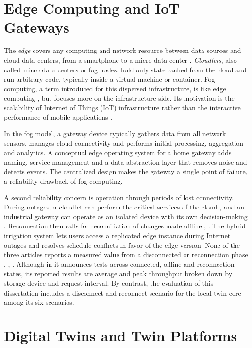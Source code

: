 \section{Edge Computing and IoT Gateways}\label{edge-computing-and-iot-gateways}

\noindent The \emph{edge} covers any computing and network resource between data sources and cloud data centers, from a smartphone to a micro data center \cite{word02} . \emph{Cloudlets}, also called micro data centers or fog nodes, hold only state cached from the cloud and run arbitrary code, typically inside a virtual machine or container\cite{word01}. Fog computing, a term introduced for this dispersed infrastructure\cite{word01}, is like edge computing \cite{word02} , but focuses more on the infrastructure side. Its motivation is the scalability of Internet of Things (IoT) infrastructure rather than the interactive performance of mobile applications \cite{word01}.

In the fog model, a gateway device typically gathers data from all network sensors, manages cloud connectivity and performs initial processing, aggregation and analytics\cite{word08}. A conceptual edge operating system for a home gateway adds naming, service management and a data abstraction layer that removes noise and detects events\cite{word02}. The centralized design makes the gateway a single point of failure, a reliability drawback of fog computing\cite{word08}.

A second reliability concern is operation through periods of lost connectivity. During outages, a cloudlet can perform the critical services of the cloud \cite{word01}, and an industrial gateway can operate as an isolated device with its own decision-making \cite{word08}. Reconnection then calls for reconciliation of changes made offline \cite{word01}, \cite{word09}. The hybrid irrigation system \cite{word09} lets users access a replicated edge instance during Internet outages and resolves schedule conflicts in favor of the edge version. None of the three articles reports a measured value from a disconnected or reconnection phase \cite{word01}, \cite{word08}, \cite{word09}. Although in \cite{word09} it announces tests across connected, offline and reconnection states, its reported results are average and peak throughput broken down by storage device and request interval. By contrast, the evaluation of this dissertation includes a disconnect and reconnect scenario for the local twin core among its six scenarios.

\section{Digital Twins and Twin Platforms}\label{digital-twins-and-twin-platforms}

